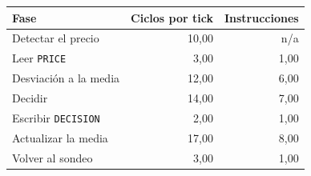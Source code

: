 \begin{tabular}{lrr}
\toprule
Fase & Ciclos por tick & Instrucciones \\
\midrule
Detectar el precio & 10{,}00 & n/a \\
Leer \texttt{PRICE} & 3{,}00 & 1{,}00 \\
Desviación a la media & 12{,}00 & 6{,}00 \\
Decidir & 14{,}00 & 7{,}00 \\
Escribir \texttt{DECISION} & 2{,}00 & 1{,}00 \\
Actualizar la media & 17{,}00 & 8{,}00 \\
Volver al sondeo & 3{,}00 & 1{,}00 \\
\bottomrule
\end{tabular}
